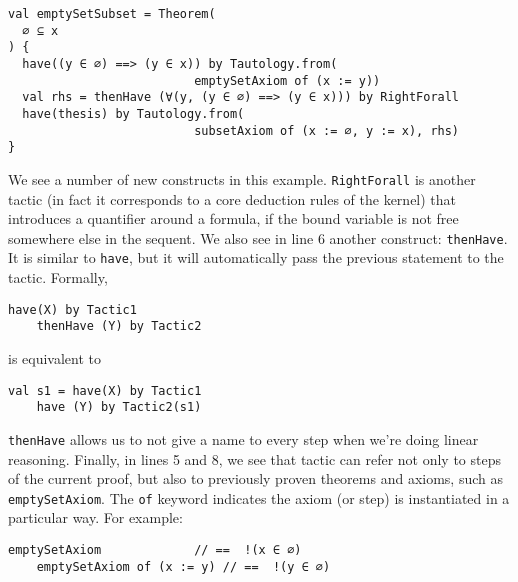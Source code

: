 \noindent\begin{minipage}{\linewidth}\vspace{1em}
  \begin{lstlisting}[language=lisa, frame=single]
val emptySetSubset = Theorem(
  ∅ ⊆ x
) {
  have((y ∈ ∅) ==> (y ∈ x)) by Tautology.from(
                          emptySetAxiom of (x := y))
  val rhs = thenHave (∀(y, (y ∈ ∅) ==> (y ∈ x))) by RightForall
  have(thesis) by Tautology.from(
                          subsetAxiom of (x := ∅, y := x), rhs)
}
  \end{lstlisting}
\end{minipage}
We see a number of new constructs in this example. \lstinline|RightForall| is another tactic (in fact it corresponds to a core deduction rules of the kernel) that introduces a quantifier around a formula, if the bound variable is not free somewhere else in the sequent.
We also see in line 6 another construct: \lstinline|thenHave|. It is similar to \lstinline|have|, but it will automatically pass the previous statement to the tactic. Formally,
\noindent\begin{minipage}{\linewidth}\vspace{1em}
  \begin{lstlisting}[language=lisa, frame=single]
    have(X) by Tactic1
    thenHave (Y) by Tactic2
  \end{lstlisting}
\end{minipage}
is equivalent to

\noindent\begin{minipage}{\linewidth}\vspace{1em}
  \begin{lstlisting}[language=lisa, frame=single]
    val s1 = have(X) by Tactic1
    have (Y) by Tactic2(s1)
  \end{lstlisting}
\end{minipage}
\lstinline|thenHave| allows us to not give a name to every step when we're doing linear reasoning. Finally, in lines 5 and 8, we see that tactic can refer not only to steps of the current proof, but also to previously proven theorems and axioms, such as \lstinline|emptySetAxiom|. The \lstinline|of| keyword indicates the axiom (or step) is instantiated in a particular way. For example:
\noindent\begin{minipage}{\linewidth}\vspace{1em}
  \begin{lstlisting}[language=lisa, frame=single]
    emptySetAxiom             // ==  !(x ∈ ∅)
    emptySetAxiom of (x := y) // ==  !(y ∈ ∅)
  \end{lstlisting}
\end{minipage}

